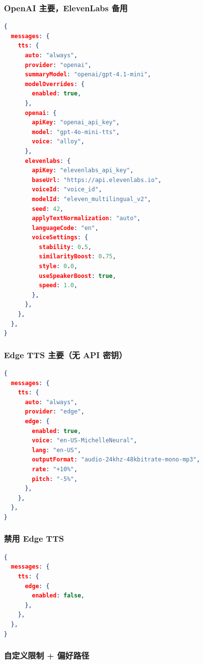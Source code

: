 \subsubsection{OpenAI 主要，ElevenLabs 备用}


\begin{lstlisting}[language=json]
{
  messages: {
    tts: {
      auto: "always",
      provider: "openai",
      summaryModel: "openai/gpt-4.1-mini",
      modelOverrides: {
        enabled: true,
      },
      openai: {
        apiKey: "openai_api_key",
        model: "gpt-4o-mini-tts",
        voice: "alloy",
      },
      elevenlabs: {
        apiKey: "elevenlabs_api_key",
        baseUrl: "https://api.elevenlabs.io",
        voiceId: "voice_id",
        modelId: "eleven_multilingual_v2",
        seed: 42,
        applyTextNormalization: "auto",
        languageCode: "en",
        voiceSettings: {
          stability: 0.5,
          similarityBoost: 0.75,
          style: 0.0,
          useSpeakerBoost: true,
          speed: 1.0,
        },
      },
    },
  },
}
\end{lstlisting}


\subsubsection{Edge TTS 主要（无 API 密钥）}


\begin{lstlisting}[language=json]
{
  messages: {
    tts: {
      auto: "always",
      provider: "edge",
      edge: {
        enabled: true,
        voice: "en-US-MichelleNeural",
        lang: "en-US",
        outputFormat: "audio-24khz-48kbitrate-mono-mp3",
        rate: "+10%",
        pitch: "-5%",
      },
    },
  },
}
\end{lstlisting}


\subsubsection{禁用 Edge TTS}


\begin{lstlisting}[language=json]
{
  messages: {
    tts: {
      edge: {
        enabled: false,
      },
    },
  },
}
\end{lstlisting}


\subsubsection{自定义限制 + 偏好路径}


